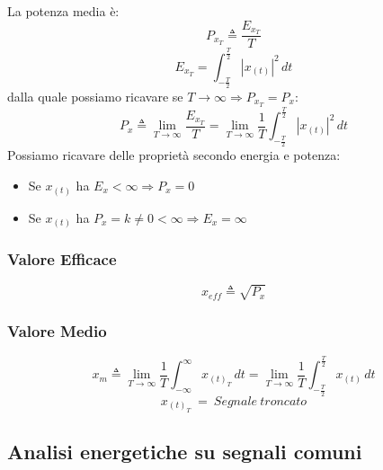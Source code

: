             La potenza media è:
            \[
                P_{x_{T}} \triangleq \frac{E_{x_{T}}}{T}    
            \]
            \[
                E_{x_{T}} = \int_{-\frac{T}{2}}^{\frac{T}{2}}  |x_{(t)}|^2 \,dt  
            \]
            dalla quale possiamo ricavare se $T \rightarrow \infty \Rightarrow P_{x_{T}} = P_{x}$:
            \[
                P_{x} \triangleq \lim_{T\rightarrow\infty} \frac{E_{x_{T}}}{T} =\lim_{T\rightarrow\infty} \frac{1}{T} \int_{-\frac{T}{2}}^{\frac{T}{2}}  |x_{(t)}|^2 \,dt    
            \]  
            Possiamo ricavare delle proprietà secondo energia e potenza:
            \begin{itemize}
                \item Se $x_{(t)}$ ha $E_x < \infty \Rightarrow P_x = 0$
                \item Se $x_{(t)}$ ha $P_x = k \neq 0 < \infty \Rightarrow E_x = \infty$
            \end{itemize}
        \subsubsection{Valore Efficace}\label{Valore Efficace}
                \[    
                    x_{eff} \triangleq \sqrt{P_{x}}
                \]
        
        \subsubsection{Valore Medio}\label{Valore medio}

                    \[
                        x_{m} \triangleq \lim_{T\rightarrow\infty} \frac{1}{T} \int_{-\infty}^{\infty}  x_{(t)_T} \,dt = \lim_{T\rightarrow\infty} \frac{1}{T} \int_{-\frac{T}{2}}^{\frac{T}{2}}  x_{(t)} \,dt 
                    \]
                    \[
                        x_{(t)_T}\ =\ Segnale\ troncato
                    \]
                    
    \subsection{Analisi energetiche su segnali comuni}
